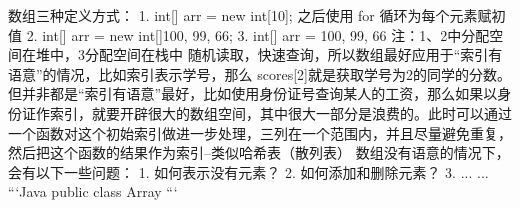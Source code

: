\markdownRendererInterblockSeparator
{}\markdownRendererInterblockSeparator
{}数组三种定义方式： 1. int[] arr = new int[10]; 之后使用 for 循环为每个元素赋初值 2. int[] arr = new int[]\markdownRendererLeftBrace{}100, 99, 66\markdownRendererRightBrace{}; 3. int[] arr = \markdownRendererLeftBrace{}100, 99, 66\markdownRendererRightBrace{} 注：1、2中分配空间在堆中，3分配空间在栈中\markdownRendererInterblockSeparator
{}\markdownRendererInterblockSeparator
{}随机读取，快速查询，所以数组最好应用于“索引有语意”的情况，比如索引表示学号，那么 scores[2]就是获取学号为2的同学的分数。\markdownRendererInterblockSeparator
{}但并非都是“索引有语意”最好，比如使用身份证号查询某人的工资，那么如果以身份证作索引，就要开辟很大的数组空间，其中很大一部分是浪费的。此时可以通过一个函数对这个初始索引做进一步处理，三列在一个范围内，并且尽量避免重复，然后把这个函数的结果作为索引--类似哈希表（散列表）\markdownRendererInterblockSeparator
{}数组没有语意的情况下，会有以下一些问题： 1. 如何表示没有元素？ 2. 如何添加和删除元素？ 3. ... ...\markdownRendererInterblockSeparator
{}```Java public class Array\markdownRendererLeftBrace{}\markdownRendererInterblockSeparator
{}\markdownRendererInterblockSeparator
{}\markdownRendererRightBrace{} ```\relax